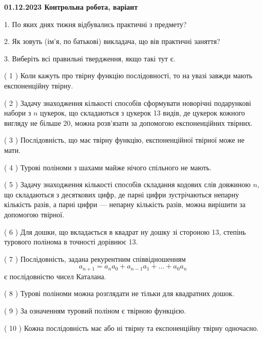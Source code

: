 \documentclass[12pt, ukrainian]{article}
\begin{document}
\vspace{4mm}
\newpage
\begin {large}

\textbf{01.12.2023 Контрольна робота, варіант  }\par


{
1. По яких днях тижня відбувались практичні з предмету?



\vspace{5mm}
2. Як зовуть (ім'я, по батькові) викладача, що вів практичні заняття?



\vspace{5mm}
3. Виберіть всі правильні твердження, якщо такі тут є.\par
\vspace{2mm}
( 1 ) Коли кажуть про твірну функцію послідовності, то на увазі завжди мають експоненційну твірну.%

( 2 ) Задачу знаходження кількості способів сформувати новорічні подарункові набори з $n$ цукерок, що складаються з цукерок 13 видів, де цукерок кожного вигляду не більше 20, можна розв’язати за допомогою експоненційних твірних.%

( 3 ) Послідовність, що має твірну функцію, експоненційної твірної може не мати.%

( 4 ) Турові поліноми з шахами майже нічого спільного не мають.%

( 5 ) Задачу знаходження кількості способів складання кодових слів довжиною $n$, що складаються з десяткових цифр, де парні цифри зустрічаються непарну кількість разів, а парні цифри — непарну кількість разів, можна вирішити за допомогою твірної.%

( 6 ) Для дошки, що вкладається в квадрат ну дошку зі стороною 13, степінь турового полінома в точності дорівнює 13.%

( 7 ) Послідовність, задана рекурентним співвідношенням $$a_{n+1}=a_{n}a_{0}+a_{n-1}a_{1}+\ldots+a_0a_{n}$$ є послідовністю чисел Каталана.%

( 8 ) Турові поліноми можна розглядати не тільки для квадратних дошок.%

( 9 ) За означенням туровий поліном є твірною функцією.%

( 10 ) Кожна послідовність має або ні твірну та експоненційну твірну одночасно.%
}
\end {large}
\end{document}
